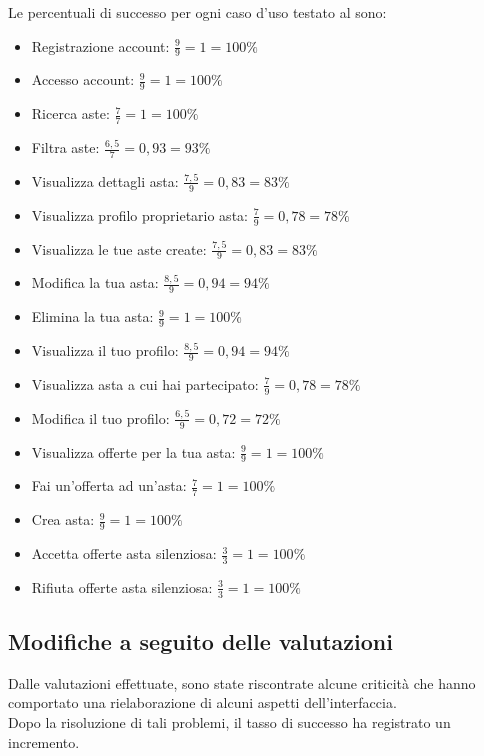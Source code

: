             \vspace{0.5cm}
            
            \noindent Le percentuali di successo per ogni caso d'uso testato al sono:
            \begin{itemize}
                \item Registrazione account: $\frac{9}{9} = 1 = 100\%$
                \item Accesso account: $\frac{9}{9} = 1 = 100\%$
                \item Ricerca aste: $\frac{7}{7} = 1 = 100\%$
                \item Filtra aste: $\frac{6,5}{7} = 0,93 = 93\%$
                \item Visualizza dettagli asta: $\frac{7,5}{9} = 0,83 = 83\%$
                \item Visualizza profilo proprietario asta: $\frac{7}{9} = 0,78 = 78\%$
                \item Visualizza le tue aste create: $\frac{7,5}{9} = 0,83 = 83\%$
                \item Modifica la tua asta: $\frac{8,5}{9} = 0,94 = 94\%$
                \item Elimina la tua asta: $\frac{9}{9} = 1 = 100\%$
                \item Visualizza il tuo profilo: $\frac{8,5}{9} = 0,94 = 94\%$
                \item Visualizza asta a cui hai partecipato: $\frac{7}{9} = 0,78 = 78\%$
                \item Modifica il tuo profilo: $\frac{6,5}{9} = 0,72 = 72\%$
                \item Visualizza offerte per la tua asta: $\frac{9}{9} = 1 = 100\%$
                \item Fai un'offerta ad un'asta: $\frac{7}{7} = 1 = 100\%$
                \item Crea asta: $\frac{9}{9} = 1 = 100\%$
                \item Accetta offerte asta silenziosa: $\frac{3}{3} = 1 = 100\%$
                \item Rifiuta offerte asta silenziosa: $\frac{3}{3} = 1 = 100\%$
            \end{itemize}
        
        \subsection{Modifiche a seguito delle valutazioni}
            Dalle valutazioni effettuate, sono state riscontrate alcune criticità che hanno comportato una rielaborazione di alcuni aspetti dell’interfaccia. \\
            Dopo la risoluzione di tali problemi, il tasso di successo ha registrato un incremento.

